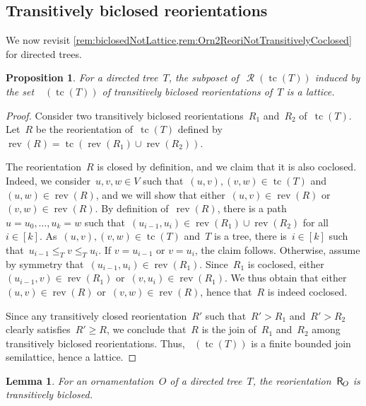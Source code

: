\documentclass{amsart}
\newtheorem{proposition}[theorem]{Proposition}
\newtheorem{lemma}[theorem]{Lemma}
\theoremstyle{definition}
\renewcommand{\c}[1]{\mathcal{#1}} %
\DeclareMathOperator{\tc}{tc} %
\newcommand{\mymap}[2]{\mathsf{#1}_{\hspace{-.7pt}#2}}
\DeclareMathOperator{\Reori}{\c{R}}  %
\newcommand{\reori}[1]{\mymap{R}{#1}}  %
\DeclareMathOperator{\Rbi}{\c{R}^{bi}}  %
\DeclareMathOperator{\rev}{rev} %
\begin{document}

\subsection{Transitively biclosed reorientations}
\label{subsec:transitivelyBiclosedReorientationsT}

We now revisit \cref{rem:biclosedNotLattice,rem:Orn2ReoriNotTransitivelyCoclosed} for directed trees.

\begin{proposition}
\label{prop:biclosedLatticeT}
For a directed tree~$T$, the subposet of~$\Reori(\tc(T))$ induced by the set~$\Rbi(\tc(T))$ of transitively biclosed reorientations of~$T$ is a lattice.
\end{proposition}

\begin{proof}
Consider two transitively biclosed reorientations~$R_1$ and~$R_2$ of~$\tc(T)$.
Let~$R$ be the reorientation of~$\tc(T)$ defined by~$\rev(R) = \tc(\rev(R_1) \cup \rev(R_2))$.

The reorientation~$R$ is closed by definition, and we claim that it is also coclosed.
Indeed, we consider~$u,v,w \in V$ such that~$(u,v), (v,w) \in \tc(T)$ and~$(u,w) \in \rev(R)$, and we will show that either~$(u,v) \in \rev(R)$ or~$(v,w) \in \rev(R)$.
By definition of~$\rev(R)$, there is a path~${u = u_0, \dots, u_k = w}$ such that~$(u_{i-1}, u_i) \in \rev(R_1) \cup \rev(R_2)$ for all~$i \in [k]$.
As~$(u,v), (v,w) \in \tc(T)$ and~$T$ is a tree, there is~$i \in [k]$ such that~$u_{i-1} \le_T v \le_T u_i$.
If $v = u_{i-1}$ or $v = u_i$, the claim follows. 
Otherwise, assume by symmetry that~$(u_{i-1}, u_i) \in \rev(R_1)$.
Since~$R_1$ is coclosed, either~$(u_{i-1}, v) \in \rev(R_1)$ or~$(v, u_i) \in \rev(R_1)$.
We thus obtain that either~$(u,v) \in \rev(R)$ or~$(v,w) \in \rev(R)$, hence that~$R$ is indeed coclosed.

Since any transitively closed reorientation~$R'$ such that~$R' > R_1$ and~$R' > R_2$ clearly satisfies~$R' \ge R$, we conclude that~$R$ is the join of~$R_1$ and~$R_2$ among transitively biclosed reorientations.
Thus, $\Rbi(\tc(T))$ is a finite bounded join semilattice, hence a lattice.
\end{proof}

\begin{lemma}
\label{lem:Orn2ReoriT}
For an ornamentation~$O$ of a directed tree~$T$, the reorientation~$\reori{O}$ is transitively biclosed.
\end{lemma}
\end{document}
